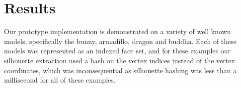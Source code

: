 \documentclass[review]{acmsiggraph}
\begin{document}



\section{Results} \label{sec:results}
Our prototype implementation is demonstrated on a variety of well known models,
specifically the bunny, armadillo, dragon and buddha. Each of these models was
represented as an indexed face set, and for these examples our silhouette
extraction used a hash on the vertex indices instead of the vertex
coordinates, which was inconsequential as silhouette hashing was less than a
millisecond for all of these examples.
\end{document}
